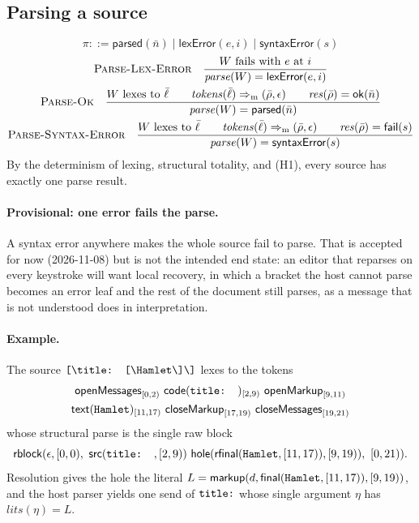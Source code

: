 \documentclass[11pt]{article}
\numberwithin{equation}{section}
\newcommand{\kw}[1]{\ensuremath{\mathsf{#1}}}
\newcommand{\str}[1]{\ensuremath{\text{\texttt{#1}}}}
\newcommand{\bs}{\textbackslash}
\newcommand{\rulelabel}[1]{\textsc{#1}}
\begin{document}
\subsection{Parsing a source}

\begin{equation}\label{eq:parse-results}
\pi ::= \kw{parsed}(\bar n) \mid \kw{lexError}(e, i)
  \mid \kw{syntaxError}(s)
\end{equation}
\begin{gather}
\label{eq:parse-lex-error}
\rulelabel{Parse-Lex-Error}\quad
\frac{W \text{ fails with } e \text{ at } i}
     {\mathit{parse}(W) = \kw{lexError}(e, i)}
\\
\label{eq:parse-ok}
\rulelabel{Parse-Ok}\quad
\frac{W \text{ lexes to } \bar\ell
      \qquad \mathit{tokens}(\bar\ell) \Rightarrow_{\mathrm{m}}
        (\bar\rho, \epsilon)
      \qquad \mathit{res}(\bar\rho) = \kw{ok}(\bar n)}
     {\mathit{parse}(W) = \kw{parsed}(\bar n)}
\\
\label{eq:parse-syntax-error}
\rulelabel{Parse-Syntax-Error}\quad
\frac{W \text{ lexes to } \bar\ell
      \qquad \mathit{tokens}(\bar\ell) \Rightarrow_{\mathrm{m}}
        (\bar\rho, \epsilon)
      \qquad \mathit{res}(\bar\rho) = \kw{fail}(s)}
     {\mathit{parse}(W) = \kw{syntaxError}(s)}
\end{gather}
By the determinism of lexing, structural totality, and (H1), every source
has exactly one parse result.

\paragraph{Provisional: one error fails the parse.}
A syntax error anywhere makes the whole source fail to parse.  That is
accepted for now (2026-11-08) but is not the intended end state: an editor
that reparses on every keystroke will want local recovery, in which a
bracket the host cannot parse becomes an error leaf and the rest of the
document still parses, as a message that is not understood does in
interpretation.

\paragraph{Example.}
The source $\str{[\bs{}title: [\bs{}Hamlet\bs]\bs]}$ lexes to the tokens
\begin{gather*}
\kw{openMessages}_{[0,2)}\ \kw{code}(\str{title: })_{[2,9)}\
\kw{openMarkup}_{[9,11)}
\\
\kw{text}(\str{Hamlet})_{[11,17)}\
\kw{closeMarkup}_{[17,19)}\ \kw{closeMessages}_{[19,21)}
\end{gather*}
whose structural parse is the single raw block
\[
\kw{rblock}(\epsilon, [0,0),\
  \kw{src}(\str{title: }, [2,9))\
  \kw{hole}(\kw{rfinal}(\str{Hamlet}, [11,17)), [9,19)),\ [0,21)).
\]
Resolution gives the hole the literal
$L = \kw{markup}(d, \kw{final}(\str{Hamlet}, [11,17)), [9,19))$, and the host
parser yields one send of $\str{title:}$ whose single argument $\eta$ has
$\mathit{lits}(\eta) = L$.
\end{document}
